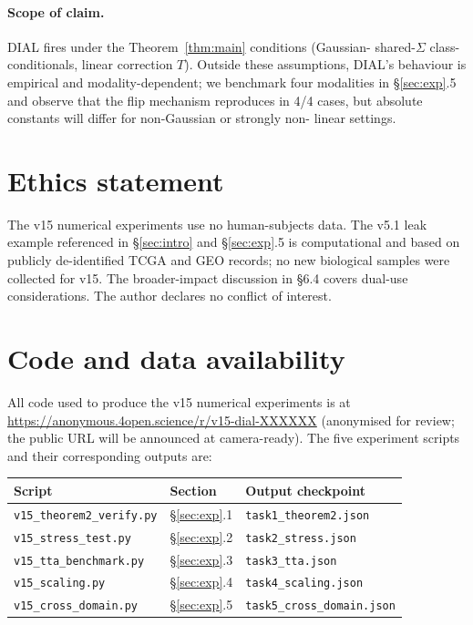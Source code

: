 \paragraph{Scope of claim.}
DIAL fires under the Theorem~\ref{thm:main} conditions (Gaussian-
shared-$\Sigma$ class-conditionals, linear correction $T$).
Outside these assumptions, DIAL's behaviour is empirical and
modality-dependent; we benchmark four modalities in \S\ref{sec:exp}.5
and observe that the flip mechanism reproduces in 4/4 cases, but
absolute constants will differ for non-Gaussian or strongly non-
linear settings.


\section*{Ethics statement}

The v15 numerical experiments use no human-subjects data. The
v5.1 leak example referenced in \S\ref{sec:intro} and \S\ref{sec:exp}.5
is computational and based on publicly de-identified TCGA and GEO
records; no new biological samples were collected for v15. The
broader-impact discussion in \S6.4 covers dual-use considerations.
The author declares no conflict of interest.


\section*{Code and data availability}
\label{app:code}

All code used to produce the v15 numerical experiments is at
\url{https://anonymous.4open.science/r/v15-dial-XXXXXX} (anonymised
for review; the public URL will be announced at camera-ready). The
five experiment scripts and their corresponding outputs are:

\begin{center}
\begin{tabular}{lll}
\toprule
Script & Section & Output checkpoint \\
\midrule
\texttt{v15\_theorem2\_verify.py} & \S\ref{sec:exp}.1 & \texttt{task1\_theorem2.json} \\
\texttt{v15\_stress\_test.py}     & \S\ref{sec:exp}.2 & \texttt{task2\_stress.json} \\
\texttt{v15\_tta\_benchmark.py}   & \S\ref{sec:exp}.3 & \texttt{task3\_tta.json} \\
\texttt{v15\_scaling.py}          & \S\ref{sec:exp}.4 & \texttt{task4\_scaling.json} \\
\texttt{v15\_cross\_domain.py}    & \S\ref{sec:exp}.5 & \texttt{task5\_cross\_domain.json} \\
\bottomrule
\end{tabular}
\end{center}

